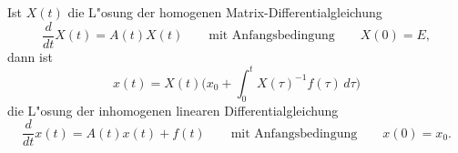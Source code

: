 \begin{satz}\label{linear:allgloesung}
Ist $X(t)$ die L"osung der homogenen Matrix-Differentialgleichung
\[
\frac{d}{dt}X(t)=A(t)X(t)
\qquad\text{mit Anfangsbedingung}\qquad
X(0)=E,
\]
dann ist
\[
x(t)=X(t)\biggl(x_0+\int_0^t X(\tau)^{-1} f(\tau)\,d\tau\biggr)
\]
die L"osung der inhomogenen linearen Differentialgleichung
\[
\frac{d}{dt}x(t)=A(t)x(t)+f(t)
\qquad\text{mit Anfangsbedingung}\qquad 
x(0)=x_0.
\]
\end{satz}
